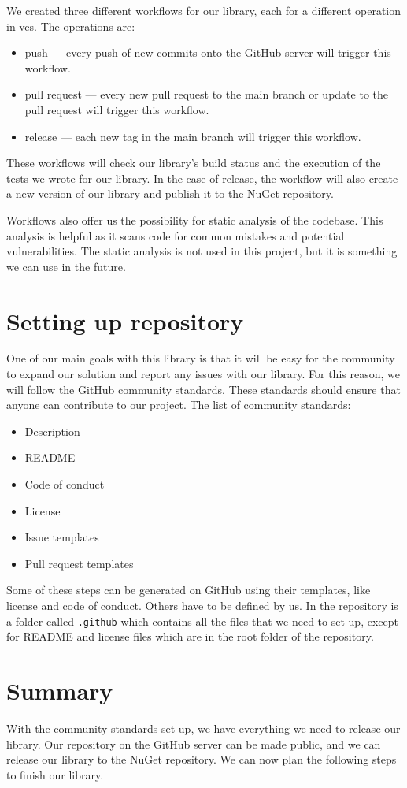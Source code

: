 We created three different workflows for our library, each for a different operation in \acrshort{vcs}. The operations are:
\begin{itemize}
    \item push --- every push of new commits onto the GitHub server will trigger this workflow.
    \item pull request --- every new pull request to the main branch or update to the pull request will trigger this workflow.
    \item release --- each new tag in the main branch will trigger this workflow.
\end{itemize}
These workflows will check our library's build status and the execution of the tests we wrote for our library.
In the case of release, the workflow will also create a new version of our library and publish it to the NuGet repository.

Workflows also offer us the possibility for static analysis of the codebase. This analysis is helpful as it scans code for common mistakes and potential vulnerabilities.
The static analysis is not used in this project, but it is something we can use in the future.

\section{Setting up repository}

One of our main goals with this library is that it will be easy for the community to expand our solution and report any issues with our library.
For this reason, we will follow the GitHub community standards. These standards should ensure that anyone can contribute to our project.
The list of community standards:
\begin{itemize}
    \item {Description}
    \item {README}
    \item {Code of conduct}
    \item {License}
    \item {Issue templates}
    \item {Pull request templates}
\end{itemize}

Some of these steps can be generated on GitHub using their templates, like license and code of conduct.
Others have to be defined by us. In the repository is a folder called \texttt{.github} which contains all the files that we need to set up, except for README and license files which are in the root folder of the repository.

\section{Summary}

With the community standards set up, we have everything we need to release our library.
Our repository on the GitHub server can be made public, and we can release our library to the NuGet repository.
We can now plan the following steps to finish our library.
